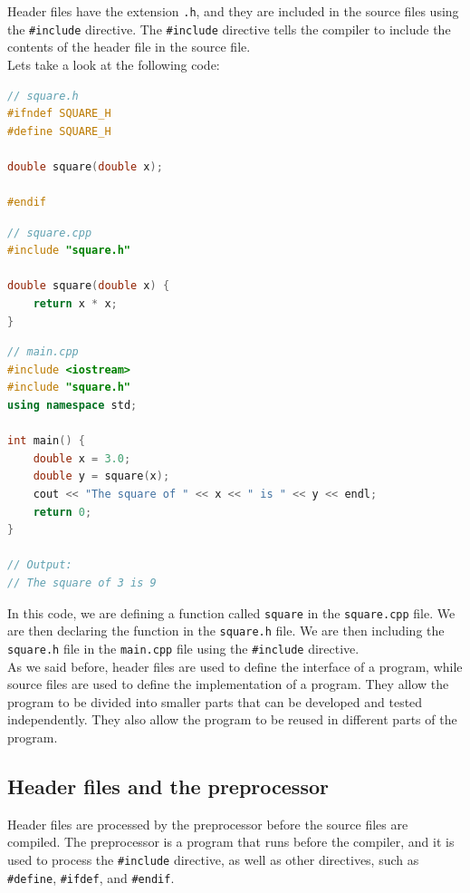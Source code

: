 Header files have the extension \texttt{.h}, and they are included in the source files using the \texttt{\#include} directive.
The \texttt{\#include} directive tells the compiler to include the contents of the header file in the source file.\\

Lets take a look at the following code:

\begin{lstlisting}[language=C++]
// square.h
#ifndef SQUARE_H
#define SQUARE_H

double square(double x);

#endif
\end{lstlisting}

\begin{lstlisting}[language=C++]
// square.cpp
#include "square.h"

double square(double x) {
    return x * x;
}
\end{lstlisting}

\begin{lstlisting}[language=C++]
// main.cpp
#include <iostream>
#include "square.h"
using namespace std;

int main() {
    double x = 3.0;
    double y = square(x);
    cout << "The square of " << x << " is " << y << endl;
    return 0;
}

// Output:
// The square of 3 is 9
\end{lstlisting}

In this code, we are defining a function called \texttt{square} in the \texttt{square.cpp} file. We are then declaring the
function in the \texttt{square.h} file. We are then including the \texttt{square.h} file in the \texttt{main.cpp} file using
the \texttt{\#include} directive.\\

As we said before, header files are used to define the interface of a program, while source files are used to define the 
implementation of a program. They allow the program to be divided into smaller parts that can be developed and tested 
independently. They also allow the program to be reused in different parts of the program.\\

\subsection{Header files and the preprocessor}

Header files are processed by the preprocessor before the source files are compiled. The preprocessor is a program that
runs before the compiler, and it is used to process the \texttt{\#include} directive, as well as other directives, such as
\texttt{\#define}, \texttt{\#ifdef}, and \texttt{\#endif}.\\

